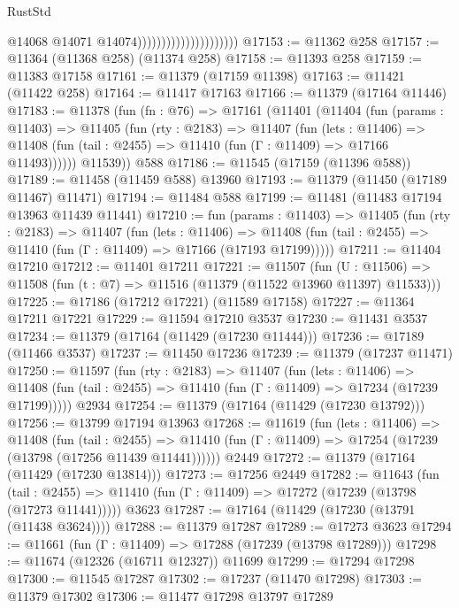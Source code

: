 \begin{lexlean}{RustStd}
\begin{coremodule}
                                              @14068
                                              @14071
                                              @14074)))))))))))))))))))))
@17153 := @11362 @258
@17157 := @11364 (@11368 @258) (@11374 @258)
@17158 := @11393 @258
@17159 := @11383 @17158
@17161 := @11379 (@17159 @11398)
@17163 := @11421 (@11422 @258)
@17164 := @11417 @17163
@17166 := @11379 (@17164 @11446)
@17183 := @11378
    (fun (fn : @76) =>
    @17161
      (@11401
        (@11404
          (fun (params : @11403) =>
          @11405
            (fun (rty : @2183) =>
            @11407
              (fun (lets : @11406) =>
              @11408 (fun (tail : @2455) => @11410 (fun (Γ : @11409) => @17166 @11493))))))
        @11539))
    @588
@17186 := @11545 (@17159 (@11396 @588))
@17189 := @11458 (@11459 @588) @13960
@17193 := @11379 (@11450 (@17189 @11467) @11471)
@17194 := @11484 @588
@17199 := @11481 (@11483 @17194 @13963 @11439 @11441)
@17210 := fun (params : @11403) =>
  @11405
    (fun (rty : @2183) =>
    @11407
      (fun (lets : @11406) =>
      @11408 (fun (tail : @2455) => @11410 (fun (Γ : @11409) => @17166 (@17193 @17199)))))
@17211 := @11404 @17210
@17212 := @11401 @17211
@17221 := @11507
    (fun (U : @11506) => @11508 (fun (t : @7) => @11516 (@11379 (@11522 @13960 @11397) @11533)))
@17225 := @17186 (@17212 @17221) (@11589 @17158)
@17227 := @11364 @17211 @17221
@17229 := @11594 @17210 @3537
@17230 := @11431 @3537
@17234 := @11379 (@17164 (@11429 (@17230 @11444)))
@17236 := @17189 (@11466 @3537)
@17237 := @11450 @17236
@17239 := @11379 (@17237 @11471)
@17250 := @11597
    (fun (rty : @2183) =>
    @11407
      (fun (lets : @11406) =>
      @11408 (fun (tail : @2455) => @11410 (fun (Γ : @11409) => @17234 (@17239 @17199)))))
    @2934
@17254 := @11379 (@17164 (@11429 (@17230 @13792)))
@17256 := @13799 @17194 @13963
@17268 := @11619
    (fun (lets : @11406) =>
    @11408
      (fun (tail : @2455) =>
      @11410 (fun (Γ : @11409) => @17254 (@17239 (@13798 (@17256 @11439 @11441))))))
    @2449
@17272 := @11379 (@17164 (@11429 (@17230 @13814)))
@17273 := @17256 @2449
@17282 := @11643
    (fun (tail : @2455) => @11410 (fun (Γ : @11409) => @17272 (@17239 (@13798 (@17273 @11441)))))
    @3623
@17287 := @17164 (@11429 (@17230 (@13791 (@11438 @3624))))
@17288 := @11379 @17287
@17289 := @17273 @3623
@17294 := @11661 (fun (Γ : @11409) => @17288 (@17239 (@13798 @17289)))
@17298 := @11674 (@12326 (@16711 @12327)) @11699
@17299 := @17294 @17298
@17300 := @11545 @17287
@17302 := @17237 (@11470 @17298)
@17303 := @11379 @17302
@17306 := @11477 @17298 @13797 @17289

\end{coremodule}
\end{lexlean}
